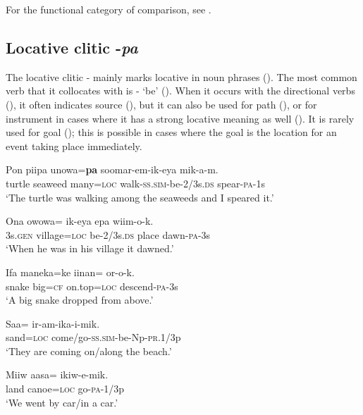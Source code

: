 For the functional category of comparison, see .

\subsection{Locative clitic -\textit{pa}}
{}
The locative clitic - mainly marks locative in noun phrases (). The most common verb that it collocates with is - `be' (). When it occurs with the directional verbs (), it often indicates source (), but it can also be used for path (), or for instrument in cases where it has a strong locative meaning as well (). It is rarely used for goal (); this is possible in cases where the goal is the location for an event taking place immediately.

\ea%
\label{ex:x762}
\gll Pon piipa unowa=\textbf{pa} soomar-em-ik-eya mik-a-m. \\
turtle seaweed many=\textsc{loc} walk-\textsc{ss}.\textsc{sim}-be-2/3s.\textsc{ds} spear-\textsc{pa}-1s\\
\glt`The turtle was walking among the seaweeds and I speared it.'
\z

\ea%
\label{ex:x1880}
\gll Ona owowa= ik-eya epa wiim-o-k. \\
3s.\textsc{gen} village=\textsc{loc} be-2/3s.\textsc{ds} place dawn-\textsc{pa}-3s\\
\glt`When he was in his village it dawned.'
\z

\ea%
\label{ex:x1877}
\gll Ifa maneka=ke iinan= or-o-k. \\
snake big=\textsc{cf} on.top=\textsc{loc} descend-\textsc{pa}-3s\\
\glt`A big snake dropped from above.'
\z

\ea%
\label{ex:x770}
\gll Saa= ir-am-ika-i-mik. \\
sand=\textsc{loc} come/go-\textsc{ss}.\textsc{sim}-be-Np-\textsc{pr}.1/3p\\
\glt`They are coming on/along the beach.'
\z

\ea%
\label{ex:x771}
\gll Miiw aasa= ikiw-e-mik. \\
land canoe=\textsc{loc} go-\textsc{pa}-1/3p\\
\glt`We went by car/in a car.'
\z

